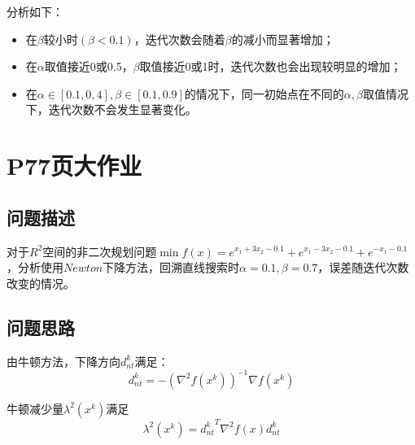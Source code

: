 \documentclass{article}
\begin{document}
分析如下：
\begin{itemize}
    \item 在$\beta$较小时$(\beta<0.1)$，迭代次数会随着$\beta$的减小而显著增加；
    \item 在$\alpha$取值接近0或0.5，$\beta$取值接近0或1时，迭代次数也会出现较明显的增加；
    \item 在$\alpha \in \left[0.1,0,4\right],\beta \in \left[0.1,0.9\right]$的情况下，同一初始点在不同的$\alpha,\beta$取值情况下，迭代次数不会发生显著变化。
\end{itemize}


\section{P77页大作业}
\subsection{问题描述}
对于$R^2$空间的非二次规划问题$\min f(x)=e^{x_1+3x_2-0.1}+e^{x_1-3x_2-0.1}+e^{-x_1-0.1}$，分析使用$Newton$下降方法，回溯直线搜索时$\alpha=0.1,\beta=0.7$，误差随迭代次数改变的情况。

\subsection{问题思路}
由牛顿方法，下降方向$d^k_{nt}$满足：
\begin{equation*}
    d^k_{nt}=-(\nabla^2 f(x^k))^{-1} \nabla f(x^k)
\end{equation*}

牛顿减少量$\lambda^2(x^k)$满足
\begin{equation*}
    \lambda^2(x^k)={d^k_{nt}}^T \nabla^2 f(x) d^k_{nt}
\end{equation*}
\end{document}
